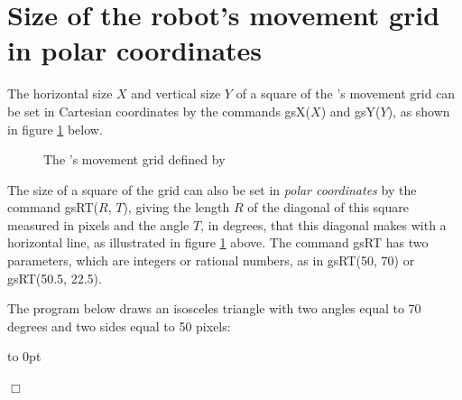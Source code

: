 \section{Size of the robot's movement grid in polar coordinates}
The horizontal size $X$ and vertical size $Y$ of a square of the \robot's movement
grid can be set in Cartesian coordinates by the commands
{\idt gsX(}$X${\idt )} and {\idt gsY(}$Y${\idt )}, as shown in figure \ref{fig:lgrt} below.

\begin{figure}[h]
 \parbox{13.7cm}{\caption{The \protect\robot's movement grid defined by}\label{fig:lgrt}}
\end{figure}

The size of a square of the grid can also be set in {\em polar
coordinates} by the command
{\idt gsRT(}$R${\idt ,} $T${\idt )}, giving the length $R$ of the diagonal of this square measured
in pixels and
the angle $T$, in degrees, that this diagonal makes with a horizontal line,
as illustrated in figure \ref{fig:lgrt} above. The command {\idt gsRT} has two
parameters, which are integers or rational numbers, as in {\idt gsRT(50, 70)} or
{\idt gsRT(50.5, 22.5)}.

\begin{exemple}{\rm
The program below draws an isosceles triangle with two angles equal
to 70 degrees and two sides equal to 50 pixels:

{\raggedright
 \vbox to 0pt{}%
 
 }
\noindent $\Box$ }
\end{exemple}

